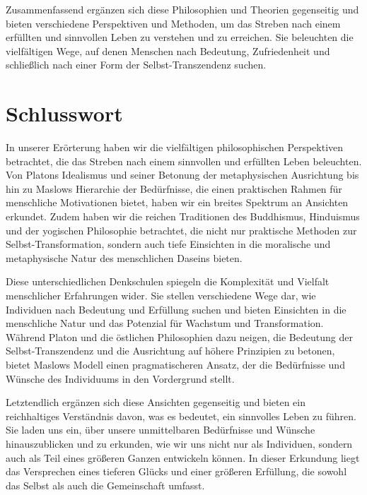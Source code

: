 \documentclass[12pt,a4paper]{article}
\begin{document}
Zusammenfassend ergänzen sich diese Philosophien und Theorien gegenseitig und bieten verschiedene Perspektiven und Methoden, um das Streben nach einem erfüllten und sinnvollen Leben zu verstehen und zu erreichen. Sie beleuchten die vielfältigen Wege, auf denen Menschen nach Bedeutung, Zufriedenheit und schließlich nach einer Form der Selbst-Transzendenz suchen.

\newpage

\section{Schlusswort}
In unserer Erörterung haben wir die vielfältigen philosophischen Perspektiven betrachtet, die das Streben nach einem sinnvollen und erfüllten Leben beleuchten. Von Platons Idealismus und seiner Betonung der metaphysischen Ausrichtung bis hin zu Maslows Hierarchie der Bedürfnisse, die einen praktischen Rahmen für menschliche Motivationen bietet, haben wir ein breites Spektrum an Ansichten erkundet. Zudem haben wir die reichen Traditionen des Buddhismus, Hinduismus und der yogischen Philosophie betrachtet, die nicht nur praktische Methoden zur Selbst-Transformation, sondern auch tiefe Einsichten in die moralische und metaphysische Natur des menschlichen Daseins bieten.

Diese unterschiedlichen Denkschulen spiegeln die Komplexität und Vielfalt menschlicher Erfahrungen wider. Sie stellen verschiedene Wege dar, wie Individuen nach Bedeutung und Erfüllung suchen und bieten Einsichten in die menschliche Natur und das Potenzial für Wachstum und Transformation. Während Platon und die östlichen Philosophien dazu neigen, die Bedeutung der Selbst-Transzendenz und die Ausrichtung auf höhere Prinzipien zu betonen, bietet Maslows Modell einen pragmatischeren Ansatz, der die Bedürfnisse und Wünsche des Individuums in den Vordergrund stellt.

Letztendlich ergänzen sich diese Ansichten gegenseitig und bieten ein reichhaltiges Verständnis davon, was es bedeutet, ein sinnvolles Leben zu führen. Sie laden uns ein, über unsere unmittelbaren Bedürfnisse und Wünsche hinauszublicken und zu erkunden, wie wir uns nicht nur als Individuen, sondern auch als Teil eines größeren Ganzen entwickeln können. In dieser Erkundung liegt das Versprechen eines tieferen Glücks und einer größeren Erfüllung, die sowohl das Selbst als auch die Gemeinschaft umfasst.

\newpage

\printbibliography
\end{document}
